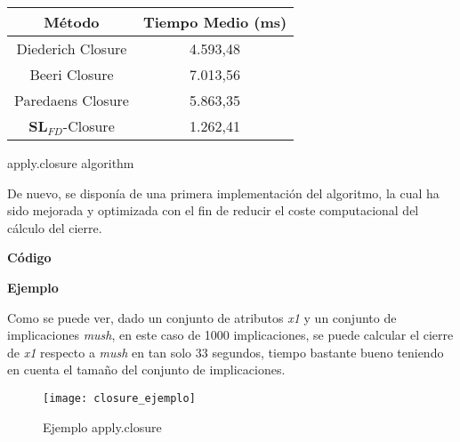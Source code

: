 \begin{center}
    \begin{tabular}{c c}
        \hline
        M\'etodo & Tiempo Medio (ms) \\
        \hline
        Diederich Closure & 4.593,48 \\   
        Beeri Closure & 7.013,56 \\   
        Paredaens Closure & 5.863,35 \\  
        \(\textbf{SL}_{FD}\)-Closure & 1.262,41 \\  
    \end{tabular}
\end{center}

\newpage

\IncMargin{1em}
\begin{algorithm}[h]
    \SetAlgoLined
    \LinesNumbered
    \DontPrintSemicolon
    \caption{apply.closure algorithm}\label{alg:2}
\end{algorithm}\DecMargin{1em}
\bigskip

De nuevo, se dispon\'ia de una primera implementaci\'on del algoritmo, la cual ha sido mejorada y optimizada con el fin de reducir el coste computacional del c\'alculo del cierre.



\newpage
\textbf{C\'odigo} 


\newpage

\textbf{Ejemplo}

Como se puede ver, dado un conjunto de atributos \textit{x1} y un conjunto de implicaciones \textit{mush}, en este caso de 1000 implicaciones, se puede calcular el cierre de \textit{x1} respecto a \textit{mush} en tan solo 33 segundos, tiempo bastante bueno teniendo en cuenta el tama\~no del conjunto de implicaciones. \\ 
\begin{figure}[h]
    \centering
    \texttt{[image: closure\_ejemplo]}
    \caption{Ejemplo apply.closure}
    \label{fig:closure_ejemplo}
\end{figure} 


